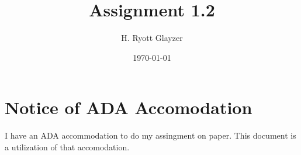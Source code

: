 \documentclass[11pt, letterpaper]{article}
\begin{document}


\title{Assignment 1.2}
\author{H. Ryott Glayzer}
\date{\today}


\maketitle


\section*{Notice of ADA Accomodation}
I have an ADA accommodation to do my assingment on paper.
This document is a utilization of that accomodation.
\end{document}
